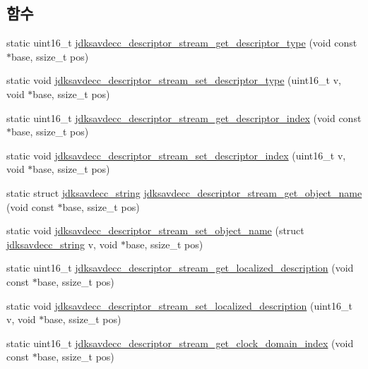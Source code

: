 \subsection*{함수}
\begin{DoxyCompactItemize}
\item 
static uint16\+\_\+t \hyperlink{group__descriptor__stream_gaea469ac868557638cd94d6ee32da8662}{jdksavdecc\+\_\+descriptor\+\_\+stream\+\_\+get\+\_\+descriptor\+\_\+type} (void const $\ast$base, ssize\+\_\+t pos)
\item 
static void \hyperlink{group__descriptor__stream_ga918e6b024130733321f895e97194daf2}{jdksavdecc\+\_\+descriptor\+\_\+stream\+\_\+set\+\_\+descriptor\+\_\+type} (uint16\+\_\+t v, void $\ast$base, ssize\+\_\+t pos)
\item 
static uint16\+\_\+t \hyperlink{group__descriptor__stream_ga7eb3ff210854a696a1cdd135facd81fb}{jdksavdecc\+\_\+descriptor\+\_\+stream\+\_\+get\+\_\+descriptor\+\_\+index} (void const $\ast$base, ssize\+\_\+t pos)
\item 
static void \hyperlink{group__descriptor__stream_ga868f3db0eb21a454419a20eb8c34c67f}{jdksavdecc\+\_\+descriptor\+\_\+stream\+\_\+set\+\_\+descriptor\+\_\+index} (uint16\+\_\+t v, void $\ast$base, ssize\+\_\+t pos)
\item 
static struct \hyperlink{structjdksavdecc__string}{jdksavdecc\+\_\+string} \hyperlink{group__descriptor__stream_ga7290ca27e5a9af5ace698b9c9cfb196d}{jdksavdecc\+\_\+descriptor\+\_\+stream\+\_\+get\+\_\+object\+\_\+name} (void const $\ast$base, ssize\+\_\+t pos)
\item 
static void \hyperlink{group__descriptor__stream_gab43bc6658692233e8d19edca16d8e29d}{jdksavdecc\+\_\+descriptor\+\_\+stream\+\_\+set\+\_\+object\+\_\+name} (struct \hyperlink{structjdksavdecc__string}{jdksavdecc\+\_\+string} v, void $\ast$base, ssize\+\_\+t pos)
\item 
static uint16\+\_\+t \hyperlink{group__descriptor__stream_ga5a240a9d26b6dbb014df8eb5ffa3b6b0}{jdksavdecc\+\_\+descriptor\+\_\+stream\+\_\+get\+\_\+localized\+\_\+description} (void const $\ast$base, ssize\+\_\+t pos)
\item 
static void \hyperlink{group__descriptor__stream_ga3a0276f53697e44d0770eebf7e1be3e8}{jdksavdecc\+\_\+descriptor\+\_\+stream\+\_\+set\+\_\+localized\+\_\+description} (uint16\+\_\+t v, void $\ast$base, ssize\+\_\+t pos)
\item 
static uint16\+\_\+t \hyperlink{group__descriptor__stream_gaadf36d2aa34c9febbdd05326a0383dc7}{jdksavdecc\+\_\+descriptor\+\_\+stream\+\_\+get\+\_\+clock\+\_\+domain\+\_\+index} (void const $\ast$base, ssize\+\_\+t pos)

\end{DoxyCompactItemize}
